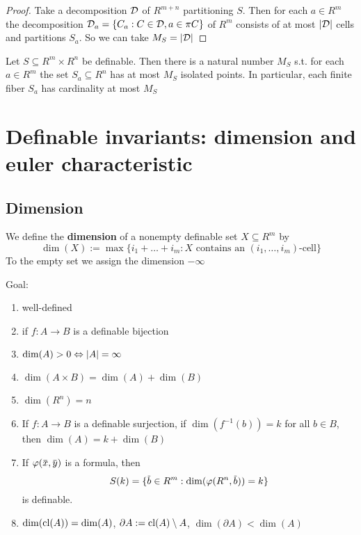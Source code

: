 \documentclass[11pt]{article}
\begin{document}
\begin{proof}
Take a decomposition \(\mathcal{D}\) of \(R^{m+n}\) partitioning \(S\). Then for each \(a\in R^m\) the
decomposition \(\mathcal{D}_a=\{C_a:C\in\mathcal{D},a\in\pi C\}\) of \(R^m\) consists of at most \(\abs{\cald}\) cells and
partitions \(S_a\). So we can take \(M_S=\abs{\cald}\)
\end{proof}

\begin{corollary}[]
Let \(S\subseteq R^m\times R^n\) be definable. Then there is a natural number \(M_S\) s.t. for each \(a\in R^m\)
the set \(S_a\subseteq R^n\) has at most \(M_S\) isolated points. In particular, each finite fiber \(S_a\)
has cardinality at most \(M_S\)
\end{corollary}

\section{Definable invariants: dimension and euler characteristic}
\label{sec:org746a89b}

\subsection{Dimension}
\label{sec:org8cfd4dd}
We define the \textbf{dimension} of a nonempty definable set \(X\subseteq R^m\) by
\begin{equation*}
\dim(X):=\max\{i_1+\dots+i_m:X\text{ contains an }(i_1,\dots,i_m)\text{-cell}\}
\end{equation*}
To the empty set we assign the dimension \(-\infty\)

Goal:
\begin{theorem}[]
\begin{enumerate}
\item well-defined
\item if \(f:A\to B\) is a definable bijection
\item \(\dim(A)>0\Leftrightarrow\abs{A}=\infty\)
\item \(\dim(A\times B)=\dim(A)+\dim(B)\)
\item \(\dim(R^n)=n\)
\item If \(f:A\to B\) is a definable surjection, if \(\dim(f^{-1}(b))=k\) for all \(b\in B\),
then \(\dim(A)=k+\dim(B)\)
\item If \(\varphi(\barx,\bary)\) is a formula, then
\begin{equation*}
S(k)=\{\barb\in R^m:\dim(\varphi(R^n,\barb))=k\}
\end{equation*}
is definable.
\item \(\dim(\operatorname{\text{cl}}(A))=\dim(A)\), \(\partial A:=\operatorname{\text{cl}}(A)\setminus A\), \(\dim(\partial A)<\dim(A)\)
\end{enumerate}
\end{theorem}
\end{document}
